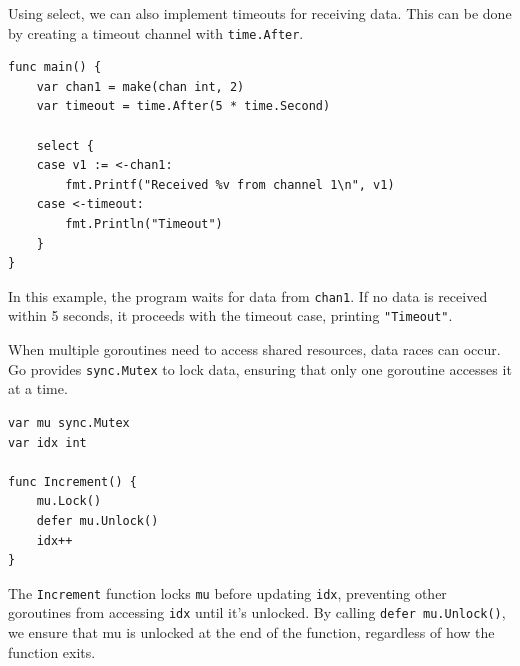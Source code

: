 Using select, we can also implement timeouts for receiving data. This can be done by creating a timeout channel with \texttt{time.After}.

\begin{verbatim}
func main() {
    var chan1 = make(chan int, 2)
    var timeout = time.After(5 * time.Second)

    select {
    case v1 := <-chan1:
        fmt.Printf("Received %v from channel 1\n", v1)
    case <-timeout:
        fmt.Println("Timeout")
    }
}
\end{verbatim}
In this example, the program waits for data from \texttt{chan1}. If no data is received within 5 seconds, it proceeds with the timeout case, printing \texttt{"Timeout"}.

When multiple goroutines need to access shared resources, data races can occur. Go provides \texttt{sync.Mutex} to lock data, ensuring that only one goroutine accesses it at a time.

\begin{verbatim}
var mu sync.Mutex
var idx int

func Increment() {
    mu.Lock()
    defer mu.Unlock()
    idx++
}
\end{verbatim}
The \texttt{Increment} function locks \texttt{mu} before updating \texttt{idx}, preventing other goroutines from accessing \texttt{idx} until it’s unlocked. By calling \texttt{defer mu.Unlock()}, we ensure that mu is unlocked at the end of the function, regardless of how the function exits.
